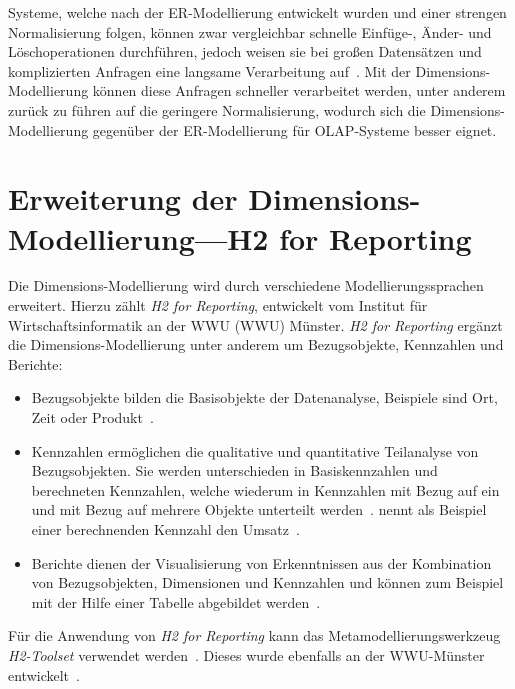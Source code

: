 \documentclass[
  language=german, %
  type=bachelor%
]{isthesis}
\begin{document}
\begin{content}
  Systeme, welche nach der ER-Modellierung entwickelt wurden und einer strengen
  Normalisierung folgen, können zwar vergleichbar schnelle Einfüge-, Änder- und
  Löschoperationen durchführen, jedoch weisen sie bei großen Datensätzen und
  komplizierten Anfragen eine langsame Verarbeitung auf~\cite[][S.
  52]{ballard2012dimensional}. Mit der Dimensions-Modellierung können diese
  Anfragen schneller verarbeitet werden\cite[][S.  52]{ballard2012dimensional},
  unter anderem zurück zu führen auf die geringere Normalisierung, wodurch
  sich die Dimensions-Modellierung gegenüber der ER-Modellierung für \acrshort{OLAP}-Systeme besser eignet.


  \section{Erweiterung der Dimensions-Modellierung---H2 for Reporting}
  Die Dimensions-Modellierung wird durch verschiedene Modellierungssprachen
  erweitert. Hierzu zählt \zB{} \textit{H2 for Reporting}, entwickelt vom
  Institut für Wirtschaftsinformatik an der \acrlong{WWU} (WWU)
  Münster. \textit{H2 for Reporting}
  ergänzt die Dimensions-Modellierung unter anderem um Bezugsobjekte,
  Kennzahlen und Berichte:
  \begin{itemize}
    \item Bezugsobjekte bilden die
      Basisobjekte der Datenanalyse, Beispiele sind Ort, Zeit oder
      Produkt~\cite[][S.  5]{becker2007h2}. 
    \item Kennzahlen ermöglichen die qualitative
      und quantitative Teilanalyse von Bezugsobjekten. Sie werden unterschieden in
      Basiskennzahlen und berechneten  Kennzahlen, welche wiederum in Kennzahlen mit
      Bezug auf ein und mit Bezug auf mehrere Objekte unterteilt werden~\cite[][S.
      15]{becker2007h2}. \textsc{\citeauthor{becker2007h2}} nennt als Beispiel
      einer berechnenden Kennzahl den Umsatz~\cite[][S. 17]{becker2007h2}.
    \item Berichte dienen der Visualisierung von Erkenntnissen aus der Kombination von
      Bezugsobjekten, Dimensionen und Kennzahlen und können zum Beispiel mit der
      Hilfe einer Tabelle abgebildet werden~\cite[][S. 23]{becker2007h2}.
  \end{itemize}

  Für die Anwendung von \textit{H2 for Reporting} kann das
  Metamodellierungswerkzeug \textit{H2-Toolset} verwendet werden~\cite[][S.
  33]{fleischer2013konstruktion}. Dieses wurde ebenfalls an der
  \acrshort{WWU}-Münster entwickelt~\cite[][S. 34]{becker2007h2}.


\end{content}
\end{document}
